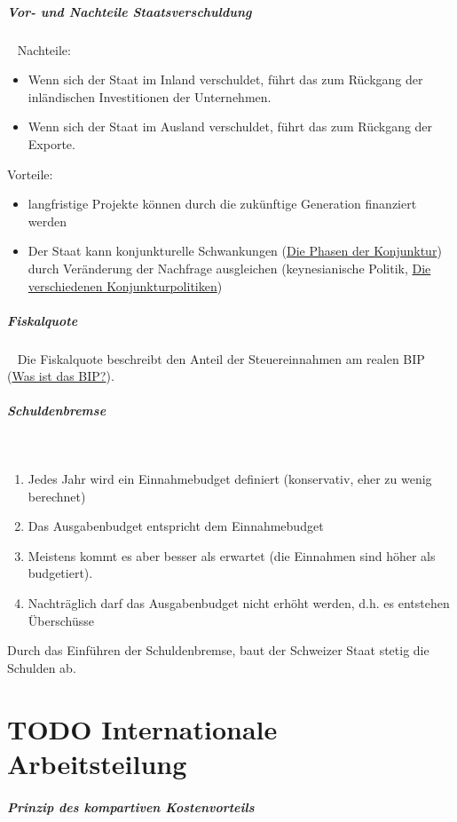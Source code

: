 \documentclass[11pt,twoside,landscape]{article}
\begin{document}
\begin{multicols}{3}
\subparagraph{Vor- und Nachteile Staatsverschuldung} \
\label{sec:org67bb51f}
Nachteile:
\begin{itemize}
\item Wenn sich der Staat im Inland verschuldet, führt das zum Rückgang der inländischen Investitionen der Unternehmen.
\item Wenn sich der Staat im Ausland verschuldet, führt das zum Rückgang der Exporte.
\end{itemize}

Vorteile:
\begin{itemize}
\item langfristige Projekte können durch die zukünftige Generation finanziert werden
\item Der Staat kann konjunkturelle Schwankungen (\href{../../../roam/20220614102344-die_phasen_der_konjunktur.org}{Die Phasen der Konjunktur}) durch Veränderung der Nachfrage ausgleichen (keynesianische Politik, \href{../../../roam/20220614161544-die_verschiedenen_konjunkturpolitiken.org}{Die verschiedenen Konjunkturpolitiken})
\end{itemize}

\subparagraph{Fiskalquote} \
\label{sec:org561d2cc}
Die Fiskalquote beschreibt den Anteil der Steuereinnahmen am realen BIP (\href{../../../roam/20220504151208-was_ist_das_bip.org}{Was ist das BIP?}).

\subparagraph{Schuldenbremse} \
\label{sec:org520a069}
\begin{enumerate}
\item Jedes Jahr wird ein Einnahmebudget definiert (konservativ, eher zu wenig berechnet)
\item Das Ausgabenbudget entspricht dem Einnahmebudget
\item Meistens kommt es aber besser als erwartet (die Einnahmen sind höher als budgetiert).
\item Nachträglich darf das Ausgabenbudget nicht erhöht werden, d.h. es entstehen Überschüsse
\end{enumerate}


Durch das Einführen der Schuldenbremse, baut der Schweizer Staat stetig die Schulden ab.

\section{{\bfseries\sffamily TODO} Internationale Arbeitsteilung}
\label{sec:org16e4f08}
\subparagraph{Prinzip des kompartiven Kostenvorteils} \
\label{sec:org413b69e}


\end{multicols}
\end{document}
